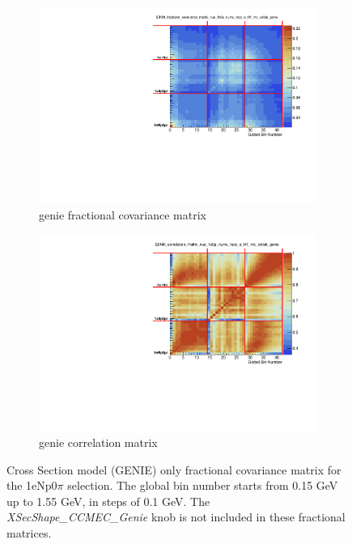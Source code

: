 \begin{figure}[ht] 
\begin{center}
    \begin{subfigure}[b]{0.48\textwidth}
    \centering
    \includegraphics[width=1.00\textwidth]{Systematics/CovarianceMatrices/SBNfit_fractional_covariance_matrix_nue_1e0p_numu_reco_e_H1_mc_collab_genie_collapsed.pdf}
    \caption{genie fractional covariance matrix}
    \end{subfigure}
    \begin{subfigure}[b]{0.48\textwidth}
    \includegraphics[width=1.00\textwidth]{Systematics/CovarianceMatrices/SBNfit_correlation_matrix_nue_1e0p_numu_reco_e_H1_mc_collab_genie_collapsed.pdf}
    \caption{genie correlation matrix}
    \end{subfigure}
\caption{\label{fig:geniematrices} Cross Section model (GENIE) only fractional covariance matrix for the 1eNp0$\pi$ selection. The global bin number starts from 0.15 GeV up to 1.55 GeV, in steps of 0.1 GeV. The \textit{XSecShape\_CCMEC\_Genie} knob is not included in these fractional matrices.}
\end{center}
\end{figure}

